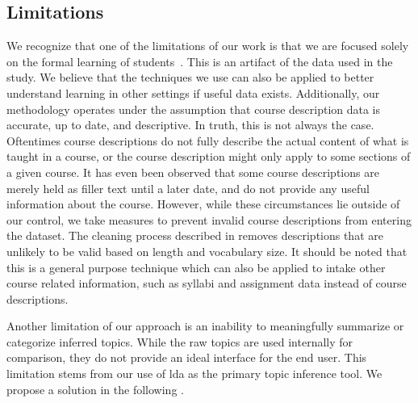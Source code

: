 
\subsection{Limitations}
\label{sec:limitations}


We recognize that one of the limitations of our work is that we are focused solely on the formal learning of students~\cite{Boustedt2011}.
This is an artifact of the data used in the study.
We believe that the techniques we use can also be applied to better understand learning in other settings if useful data exists.
Additionally, our methodology operates under the assumption that course description data is accurate, up to date, and descriptive.
In truth, this is not always the case.
Oftentimes course descriptions do not fully describe the actual content of what is taught in a course, or the course description might only apply to some sections of a given course.
It has even been observed that some course descriptions are merely held as filler text until a later date, and do not provide any useful information about the course.
However, while these circumstances lie outside of our control, we take measures to prevent invalid course descriptions from entering the dataset.
The cleaning process described in  removes descriptions that are unlikely to be valid based on length and vocabulary size.
It should be noted that this is a general purpose technique which can also be applied to intake other course related information, such as syllabi and assignment data instead of course descriptions.


Another limitation of our approach is an inability to meaningfully summarize or categorize inferred topics.
While the raw topics are used internally for comparison, they do not provide an ideal interface for the end user.
This limitation stems from our use of \ac{lda} as the primary topic inference tool.
We propose a solution in the following .

